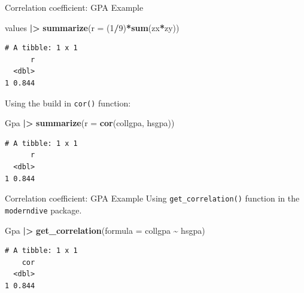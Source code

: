 \documentclass[
  ignorenonframetext,
]{beamer}
\newenvironment{Shaded}{\begin{snugshade}}{\end{snugshade}}
\newcommand{\AttributeTok}[1]{\textcolor[rgb]{0.13,0.29,0.53}{#1}}
\newcommand{\DecValTok}[1]{\textcolor[rgb]{0.00,0.00,0.81}{#1}}
\newcommand{\FunctionTok}[1]{\textcolor[rgb]{0.13,0.29,0.53}{\textbf{#1}}}
\newcommand{\NormalTok}[1]{#1}
\newcommand{\SpecialCharTok}[1]{\textcolor[rgb]{0.81,0.36,0.00}{\textbf{#1}}}
\begin{document}
\begin{frame}[fragile]{Correlation coefficient: GPA Example}
\protect{}\label{correlation-coefficient-gpa-example-3}
\normalsize

\begin{Shaded}
\begin{Highlighting}[]
\NormalTok{values }\SpecialCharTok{|\textgreater{}} 
  \FunctionTok{summarize}\NormalTok{(}\AttributeTok{r =}\NormalTok{ (}\DecValTok{1}\SpecialCharTok{/}\DecValTok{9}\NormalTok{)}\SpecialCharTok{*}\FunctionTok{sum}\NormalTok{(zx}\SpecialCharTok{*}\NormalTok{zy))}
\end{Highlighting}
\end{Shaded}

\begin{verbatim}
# A tibble: 1 x 1
      r
  <dbl>
1 0.844
\end{verbatim}

\normalsize

Using the build in \texttt{cor()} function:

\normalsize

\begin{Shaded}
\begin{Highlighting}[]
\NormalTok{Gpa }\SpecialCharTok{|\textgreater{}} 
  \FunctionTok{summarize}\NormalTok{(}\AttributeTok{r =} \FunctionTok{cor}\NormalTok{(collgpa, hsgpa))}
\end{Highlighting}
\end{Shaded}

\begin{verbatim}
# A tibble: 1 x 1
      r
  <dbl>
1 0.844
\end{verbatim}

\normalsize
\end{frame}

\begin{frame}[fragile]{Correlation coefficient: GPA Example}
\protect{}\label{correlation-coefficient-gpa-example-4}
Using \texttt{get\_correlation()} function in the \texttt{moderndive}
package.

\normalsize

\begin{Shaded}
\begin{Highlighting}[]
\NormalTok{Gpa }\SpecialCharTok{|\textgreater{}} 
  \FunctionTok{get\_correlation}\NormalTok{(}\AttributeTok{formula =}\NormalTok{ collgpa }\SpecialCharTok{\textasciitilde{}}\NormalTok{ hsgpa)}
\end{Highlighting}
\end{Shaded}

\begin{verbatim}
# A tibble: 1 x 1
    cor
  <dbl>
1 0.844
\end{verbatim}

\normalsize
\end{frame}
\end{document}
